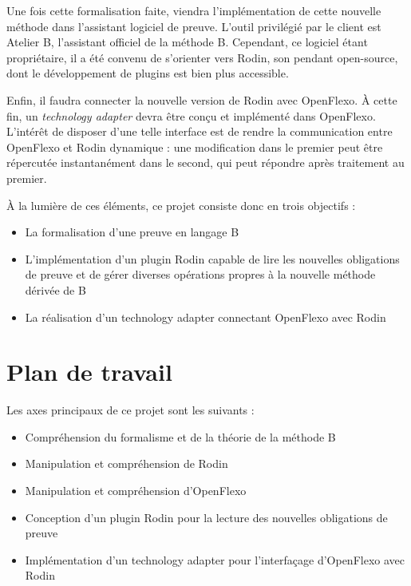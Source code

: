 \documentclass{article}
\begin{document}
Une fois cette formalisation faite, viendra l'implémentation de cette nouvelle méthode dans l'assistant logiciel de preuve.
L'outil privilégié par le client est Atelier B, l'assistant officiel de la méthode B.
Cependant, ce logiciel étant propriétaire, il a été convenu de s'orienter vers Rodin, son pendant open-source, dont le développement de plugins est bien plus accessible.

Enfin, il faudra connecter la nouvelle version de Rodin avec OpenFlexo.
À cette fin, un \textit{technology adapter} devra être conçu et implémenté dans OpenFlexo.
L'intérêt de disposer d'une telle interface est de rendre la communication entre OpenFlexo et Rodin dynamique : une modification dans le premier peut être répercutée instantanément %
dans le second, qui peut répondre après traitement au premier.

À la lumière de ces éléments, ce projet consiste donc en trois objectifs :

\vspace{\baselineskip}
\begin{itemize}
    \item La formalisation d'une preuve en langage B
    \item L'implémentation d'un plugin Rodin capable de lire les nouvelles obligations de preuve et de gérer diverses opérations propres à la nouvelle méthode dérivée de B
    \item La réalisation d'un technology adapter connectant OpenFlexo avec Rodin
\end{itemize}

\newpage



\section{Plan de travail}

Les axes principaux de ce projet sont les suivants :

\vspace{\baselineskip}
\begin{itemize}
    \item Compréhension du formalisme et de la théorie de la méthode B
    \item Manipulation et compréhension de Rodin
    \item Manipulation et compréhension d'OpenFlexo
    \item Conception d'un plugin Rodin pour la lecture des nouvelles obligations de preuve
    \item Implémentation d'un technology adapter pour l'interfaçage d'OpenFlexo avec Rodin
\end{itemize}
\vspace{\baselineskip}
\end{document}
